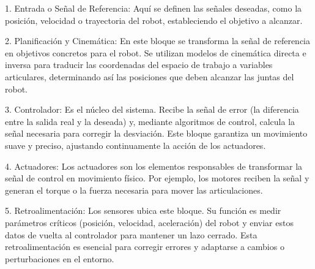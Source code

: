 1. Entrada o Señal de Referencia: Aquí se definen las señales deseadas, como la posición, velocidad o trayectoria del robot, estableciendo el objetivo a alcanzar.

2. Planificación y Cinemática: En este bloque se transforma la señal de referencia en objetivos concretos para el robot. Se utilizan modelos de cinemática directa e inversa para traducir las coordenadas del espacio de trabajo a variables articulares, determinando así las posiciones que deben alcanzar las juntas del robot.

3. Controlador: Es el núcleo del sistema. Recibe la señal de error (la diferencia entre la salida real y la deseada) y, mediante algoritmos de control, calcula la señal necesaria para corregir la desviación. Este bloque garantiza un movimiento suave y preciso, ajustando continuamente la acción de los actuadores.

4. Actuadores: Los actuadores son los elementos responsables de transformar la señal de control en movimiento físico. Por ejemplo, los motores reciben la señal y generan el torque o la fuerza necesaria para mover las articulaciones.

5. Retroalimentación: Los sensores ubica este bloque. Su función es medir parámetros críticos (posición, velocidad, aceleración) del robot y enviar estos datos de vuelta al controlador para mantener un lazo cerrado. Esta retroalimentación es esencial para corregir errores y adaptarse a cambios o perturbaciones en el entorno.
